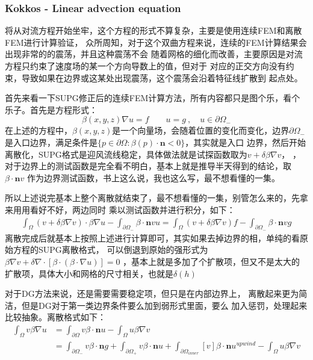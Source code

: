\subsubsection{Kokkos - Linear advection equation}
将从对流方程开始坐牢，这个方程的形式不算复杂，主要是使用连续FEM和离散FEM进行计算验证，
众所周知，对于这个双曲方程来说，连续的FEM计算结果会出现非常的的震荡，并且这种震荡不会
随着网格的细化而改善，主要原因是对流方程只约束了速度场的某一个方向导数上的值，但对于
对应的正交方向没有约束，导致如果在边界或这某处出现震荡，这个震荡会沿着特征线扩散到
起点处。

首先来看一下SUPG修正后的连续FEM计算方法，所有内容都只是图个乐，看个乐子。首先是方程形式：
\[
    \beta(x,y,z) \nabla u = f \qquad u = g \ , \quad u\in \partial \Omega_{-}
\]
在上述的方程中，$\beta(x,y,z)$是一个向量场，会随着位置的变化而变化，边界$\partial\Omega_{-}$
是入口边界，满足条件是$\{p\in\partial\Omega : \beta(p) \cdot \mathbf{n} < 0\}$，其实就是入口
边界，然后开始离散化，SUPG格式是迎风流线稳定，具体做法就是试探函数取为$v+\delta\beta\nabla v$，
，对于边界上的测试函数是完全看不明白，基本上就是推导半天得到的结论，取$\beta \cdot\mathbf{n} v$
作为边界测试函数，书上这么说，我也这么写，最不想看懂的一集。

所以上述说完基本上整个离散就结束了，最不想看懂的一集，别管怎么来的，先拿来用用看好不好，两边同时
乘以测试函数并进行积分，如下：
\[
\begin{aligned}
    \int_{\Omega} (v+\delta \beta \nabla v)\cdot \beta \nabla u - 
    \int_{\partial\Omega_{-}} \beta\cdot \mathbf{n} v u =
    \int_{\Omega} (v+\delta \beta \nabla v) f -
    \int_{\partial\Omega_{-}} \beta\cdot \mathbf{n} v g
\end{aligned}
\]
离散完成后就基本上按照上述进行计算即可，其实如果去掉边界的相，单纯的看原始方程的SUPG离散格式，
可以倒退到原始的强形式为$\beta \nabla v + \delta \nabla \cdot [\beta \cdot (\beta\cdot \nabla u)]=0$
，基本上就是多加了个扩散项，但又不是太大的扩散项，具体大小和网格的尺寸相关，也就是$\delta(h)$

对于DG方法来说，还是需要需要稳定项，但只是在内部边界上，
离散起来更为简洁，但是DG对于第一类边界条件要么加到弱形式里面，要么
加入惩罚，处理起来比较抽象。离散格式如下：
\[
    \begin{aligned}
        \int_{\Omega} v \beta \nabla u &= \int_{\partial\Omega} v \beta \cdot \mathbf{n} u -
        \int_{\Omega} u \beta \nabla v \\
        &= \int_{\partial\Omega_{-}} v \beta \cdot \mathbf{n} g + 
           \int_{\partial\Omega_{+}} v \beta \cdot \mathbf{n} u +
           \int_{\partial\Omega_{inner}} [v] \beta \cdot \mathbf{n} u^{upwind} -
           \int_{\Omega} u \beta \nabla v
    \end{aligned}
\]